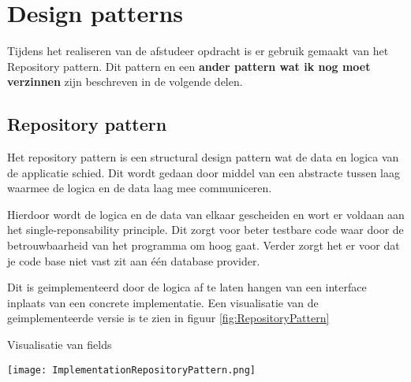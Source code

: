 \section{Design patterns}
Tijdens het realiseren van de afstudeer opdracht is er gebruik gemaakt van het Repository pattern.
Dit pattern en een \textbf{ander pattern wat ik nog moet verzinnen} zijn beschreven in de volgende delen.

\subsection{Repository pattern}
Het repository pattern is een structural design pattern wat de data en logica van de applicatie schied.
Dit wordt gedaan door middel van een abstracte tussen laag waarmee de logica en de data laag mee communiceren.

\whitespace
Hierdoor wordt de logica en de data van elkaar gescheiden en wort er voldaan aan het single-reponsability principle.
Dit zorgt voor beter testbare code waar door de betrouwbaarheid van het programma om hoog gaat.
Verder zorgt het er voor dat je code base niet vast zit aan één database provider.

\whitespace
Dit is geimplementeerd door de logica af te laten hangen van een interface inplaats van een concrete implementatie.
Een visualisatie van de geimplementeerde versie is te zien in figuur \ref{fig:RepositoryPattern}

\whitespace[2]
\begin{graphic}
    \captionsetup{type=figure}
    \caption{Visualisatie van fields}
    \texttt{[image: ImplementationRepositoryPattern.png]}
    \label{fig:RepositoryPattern}
\end{graphic}


